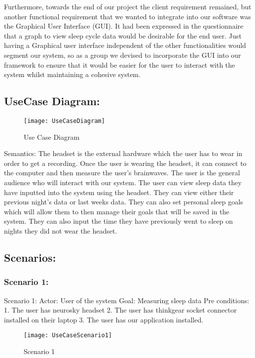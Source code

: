 Furthermore, towards the end of our project the client requirement remained, but another functional
requirement that we wanted to integrate into our software was the Graphical User Interface (GUI).
It had been expressed in the questionnaire that a graph to view sleep cycle data would be desirable for the end user.
Just having a Graphical user interface independent of the other functionalities would segment our system,
so as a group we devised to incorporate the GUI into our framework to ensure that it would be easier for
the user to interact with the system whilst maintaining a cohesive system.

\subsection{UseCase Diagram:}\label{ssec:UCD}
\begin{figure}[H]
  \centering
  \texttt{[image: UseCaseDiagram]}
  \caption{Use Case Diagram}\label{img:use-case-diagram}
\end{figure}
Semantics:
The headset is the external hardware which the user has to wear in order to get a recording.
Once the user is wearing the headset, it can connect to the computer and then measure the user’s brainwaves.
The user is the general audience who will interact with our system.
The user can view sleep data they have inputted into the system using the headset.
They can view either their previous night’s data or last weeks data.
They can also set personal sleep goals which will allow them to then manage their goals that will be saved in the system.
They can also input the time they have previously went to sleep on nights they did not wear the headset.

\subsection{Scenarios:}\label{ssec:scenar}
\subsubsection{Scenario 1:}\label{ssec:scenar1}
Scenario 1:
Actor: User of the system
Goal: Measuring sleep data
Pre conditions:
  1. The user has neurosky headset
  2. The user has thinkgear socket connector installed on their laptop
  3. The user has our application installed.
\begin{figure}[H]
  \centering
  \texttt{[image: UseCaseScenario1]}
  \caption{Scenario 1}\label{img:usecasescenario1}
\end{figure}

